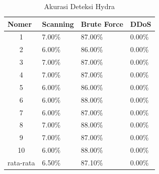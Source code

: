 \begin{table}[H]
	\centering
	\caption{Akurasi Deteksi Hydra}
	\label{Akurasi Deteksi Hydra}
	\begin{tabular}{|c|l|l|l|}
		\hline
		\multicolumn{1}{|l|}{Nomer}     & Scanning & Brute Force & DDoS   \\ \hline
		1                               & 7.00\%   & 87.00\%     & 0.00\% \\ \hline
		2                               & 6.00\%   & 86.00\%     & 0.00\% \\ \hline
		3                               & 7.00\%   & 87.00\%     & 0.00\% \\ \hline
		4                               & 7.00\%   & 87.00\%     & 0.00\% \\ \hline
		5                               & 6.00\%   & 86.00\%     & 0.00\% \\ \hline
		6                               & 6.00\%   & 88.00\%     & 0.00\% \\ \hline
		7                               & 6.00\%   & 87.00\%     & 0.00\% \\ \hline
		8                               & 7.00\%   & 88.00\%     & 0.00\% \\ \hline
		9                               & 7.00\%   & 87.00\%     & 0.00\% \\ \hline
		10                              & 6.00\%   & 88.00\%     & 0.00\% \\ \hline
		\multicolumn{1}{|l|}{rata-rata} & 6.50\%   & 87.10\%     & 0.00\% \\ \hline
	\end{tabular}
\end{table}

